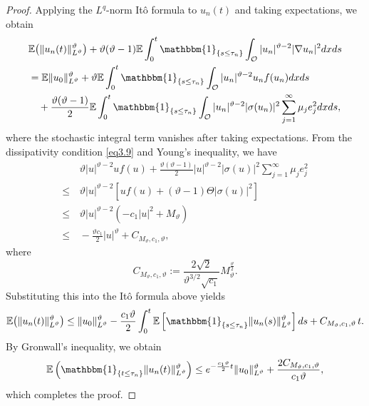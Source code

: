 \documentclass[10pt]{article}
\numberwithin{figure}{section}
\numberwithin{equation}{section}
\newcommand{\0}{{\theta}}
\def\E{\mathbb{E}}
\def\Hs{\hspace{1cm}}\def\hs{\hspace{0.5cm}}
\def\Vs{\vskip8pt}\def\vs{\vskip4pt}
\begin{document}
\begin{proof}
Applying the $L^q$-norm It\^o formula to $u_n(t)$ and taking expectations, we obtain
$$
\begin{aligned}
&\mathbb{E}\big(\|u_n(t)\|_{L^\vartheta}^\vartheta\big)
+\vartheta(\vartheta-1)\mathbb{E}\int_0^t\mathbbm{1}_{\{s\le\tau_n\}}\int_{\mathcal O}|u_n|^{\vartheta-2}|\nabla u_n|^2 dxds\\
&=\mathbb{E}\|u_0\|_{L^\vartheta}^\vartheta
+\vartheta\mathbb{E}\int_0^t\mathbbm{1}_{\{s\le\tau_n\}}\int_{\mathcal O}|u_n|^{\vartheta-2}u_n f(u_n)dxds\\
&\quad+\frac{\vartheta(\vartheta-1)}{2}\mathbb{E}\int_0^t\mathbbm{1}_{\{s\le\tau_n\}}\int_{\mathcal O}|u_n|^{\vartheta-2}|\sigma(u_n)|^2 \sum_{j=1}^{\infty} \mu_j e_j^2dxds,
\end{aligned}
$$
where the stochastic integral term vanishes after taking expectations.
\vs
From the dissipativity condition \eqref{eq3.9} and Young's inequality, we have
$$
\begin{aligned}
&\,\vartheta|u|^{\vartheta-2}u f(u)+\frac{\vartheta(\vartheta-1)}{2}|u|^{\vartheta-2}|\sigma(u)|^2\sum_{j=1}^{\infty} \mu_j e_j^2\\
\le&\, \vartheta|u|^{\vartheta-2}\left[u f(u)+(\vartheta-1)\Theta|\sigma(u)|^2\right]\\
\le&\, \vartheta|u|^{\vartheta-2}(-c_1|u|^2+M_\vartheta)\\
\le&\, -\frac{\vartheta c_1}{2}|u|^\vartheta+C_{M_\vartheta,c_1,\vartheta},
\end{aligned}
$$ where $$C_{M_\vartheta,c_1,\vartheta}:=\frac{2\sqrt{2}}{\vartheta^{3/2}\sqrt{c_1}} M_\vartheta^{\frac{\vartheta}{2}}.$$
Substituting this into the It\^o formula above yields
$$
\mathbb{E}\big(\|u_n(t)\|_{L^\vartheta}^\vartheta\big)
\le\|u_0\|_{L^\vartheta}^\vartheta
-\frac{c_1 \vartheta}{2}\int_0^t \E\left[\mathbbm{1}_{\{s\le\tau_n\}}\|u_n(s)\|_{L^\vartheta}^\vartheta\right]ds
+C_{M_\vartheta,c_1,\vartheta}\,t.
$$
By Gronwall's inequality, we obtain
$$
\mathbb{E}\left(\mathbbm{1}_{\{t\le\tau_n\}}\|u_n(t)\|_{L^\vartheta}^\vartheta\right)
\le e^{-\frac{c_1 \vartheta}{2}t} \|u_0\|_{L^\vartheta}^\vartheta
+\frac{2C_{M_\vartheta,c_1,\vartheta}}{c_1 \vartheta},
$$ which completes the proof.
\end{proof}










\end{document}
